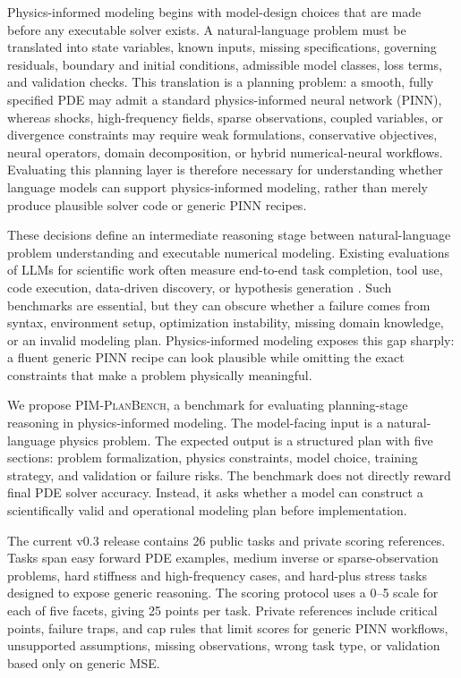 \documentclass[11pt]{article}
\newcommand{\pimplanbench}{\textsc{PIM-PlanBench}}
\begin{document}
Physics-informed modeling begins with model-design choices that are made before any executable solver exists. A natural-language problem must be translated into state variables, known inputs, missing specifications, governing residuals, boundary and initial conditions, admissible model classes, loss terms, and validation checks. This translation is a planning problem: a smooth, fully specified PDE may admit a standard physics-informed neural network (PINN), whereas shocks, high-frequency fields, sparse observations, coupled variables, or divergence constraints may require weak formulations, conservative objectives, neural operators, domain decomposition, or hybrid numerical-neural workflows. Evaluating this planning layer is therefore necessary for understanding whether language models can support physics-informed modeling, rather than merely produce plausible solver code or generic PINN recipes.

These decisions define an intermediate reasoning stage between natural-language problem understanding and executable numerical modeling. Existing evaluations of LLMs for scientific work often measure end-to-end task completion, tool use, code execution, data-driven discovery, or hypothesis generation \citep{flowbench2024,scienceagentbench2025,discoverybench2024,agentsthatmatter2024}. Such benchmarks are essential, but they can obscure whether a failure comes from syntax, environment setup, optimization instability, missing domain knowledge, or an invalid modeling plan. Physics-informed modeling exposes this gap sharply: a fluent generic PINN recipe can look plausible while omitting the exact constraints that make a problem physically meaningful.

We propose \pimplanbench{}, a benchmark for evaluating planning-stage reasoning in physics-informed modeling. The model-facing input is a natural-language physics problem. The expected output is a structured plan with five sections: problem formalization, physics constraints, model choice, training strategy, and validation or failure risks. The benchmark does not directly reward final PDE solver accuracy. Instead, it asks whether a model can construct a scientifically valid and operational modeling plan before implementation.

The current v0.3 release contains 26 public tasks and private scoring references. Tasks span easy forward PDE examples, medium inverse or sparse-observation problems, hard stiffness and high-frequency cases, and hard-plus stress tasks designed to expose generic reasoning. The scoring protocol uses a 0--5 scale for each of five facets, giving 25 points per task. Private references include critical points, failure traps, and cap rules that limit scores for generic PINN workflows, unsupported assumptions, missing observations, wrong task type, or validation based only on generic MSE.
\end{document}
